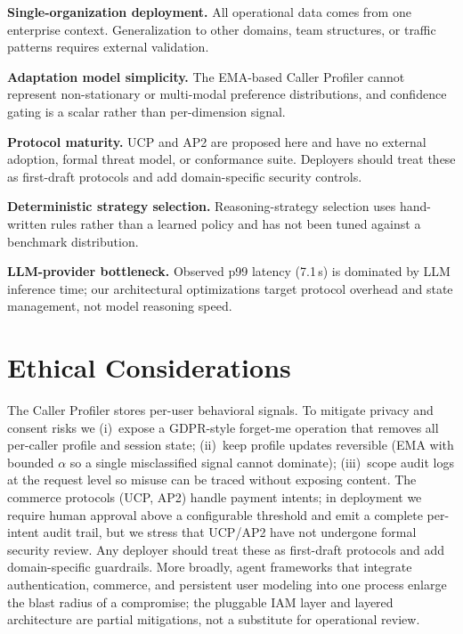 \documentclass[11pt]{article}
\begin{document}
\textbf{Single-organization deployment.} All operational data comes from one enterprise context. Generalization to other domains, team structures, or traffic patterns requires external validation.

\textbf{Adaptation model simplicity.} The EMA-based Caller Profiler cannot represent non-stationary or multi-modal preference distributions, and confidence gating is a scalar rather than per-dimension signal.

\textbf{Protocol maturity.} UCP and AP2 are proposed here and have no external adoption, formal threat model, or conformance suite. Deployers should treat these as first-draft protocols and add domain-specific security controls.

\textbf{Deterministic strategy selection.} Reasoning-strategy selection uses hand-written rules rather than a learned policy and has not been tuned against a benchmark distribution.

\textbf{LLM-provider bottleneck.} Observed p99 latency (7.1\,s) is dominated by LLM inference time; our architectural optimizations target protocol overhead and state management, not model reasoning speed.

\section*{Ethical Considerations}

The Caller Profiler stores per-user behavioral signals. To mitigate privacy and consent risks we (i)~expose a GDPR-style forget-me operation that removes all per-caller profile and session state; (ii)~keep profile updates reversible (EMA with bounded $\alpha$ so a single misclassified signal cannot dominate); (iii)~scope audit logs at the request level so misuse can be traced without exposing content. The commerce protocols (UCP, AP2) handle payment intents; in deployment we require human approval above a configurable threshold and emit a complete per-intent audit trail, but we stress that UCP/AP2 have not undergone formal security review. Any deployer should treat these as first-draft protocols and add domain-specific guardrails. More broadly, agent frameworks that integrate authentication, commerce, and persistent user modeling into one process enlarge the blast radius of a compromise; the pluggable IAM layer and layered architecture are partial mitigations, not a substitute for operational review.


\end{document}
